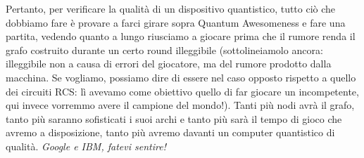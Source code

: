 \documentclass{book}
\theoremstyle{definition}
\theoremstyle{definition}
\theoremstyle{definition}
\theoremstyle{plain}
\theoremstyle{plain}
\theoremstyle{plain}
\theoremstyle{plain}
\begin{document}
\begin{itemize}
    Pertanto, per verificare la qualità di un dispositivo quantistico, tutto ciò che dobbiamo fare è provare a farci girare sopra Quantum Awesomeness e fare una partita, vedendo quanto a lungo riusciamo a giocare prima che il rumore renda il grafo costruito durante un certo round illeggibile (sottolineiamolo ancora: illeggibile non a causa di errori del giocatore, ma del rumore prodotto dalla macchina. Se vogliamo, possiamo dire di essere nel caso opposto rispetto a quello dei circuiti RCS: lì avevamo come obiettivo quello di far giocare un incompetente, qui invece vorremmo avere il campione del mondo!). Tanti più nodi avrà il grafo, tanto più saranno sofisticati i suoi archi e tanto più sarà il tempo di gioco che avremo a disposizione, tanto più avremo davanti un computer quantistico di qualità. \emph{Google e IBM, fatevi sentire!}
\end{itemize}
\end{document}
